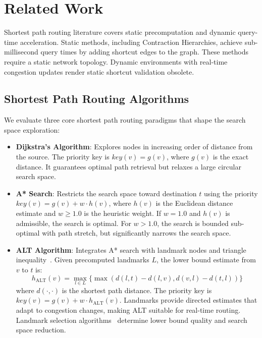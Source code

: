 \section{Related Work}
\label{sec:related}

Shortest path routing literature covers static precomputation and dynamic query-time acceleration. 
Static methods, including Contraction Hierarchies, achieve sub-millisecond query times by adding shortcut edges to the graph. 
These methods require a static network topology. 
Dynamic environments with real-time congestion updates render static shortcut validation obsolete. 

\subsection{Shortest Path Routing Algorithms}
We evaluate three core shortest path routing paradigms that shape the search space exploration:
\begin{itemize}
    \item \textbf{Dijkstra's Algorithm}: Explores nodes in increasing order of distance from the source. The priority key is $key(v) = g(v)$, where $g(v)$ is the exact distance. It guarantees optimal path retrieval but relaxes a large circular search space.
    \item \textbf{A* Search}: Restricts the search space toward destination $t$ using the priority $key(v) = g(v) + w \cdot h(v)$, where $h(v)$ is the Euclidean distance estimate and $w \ge 1.0$ is the heuristic weight. If $w = 1.0$ and $h(v)$ is admissible, the search is optimal. For $w > 1.0$, the search is bounded sub-optimal with path stretch, but significantly narrows the search space.
    \item \textbf{ALT Algorithm}: Integrates A* search with landmark nodes and triangle inequality~\cite{goldberg2004alt}. Given precomputed landmarks $L$, the lower bound estimate from $v$ to $t$ is:
    \begin{equation}
    h_{\text{ALT}}(v) = \max_{l \in L} \{ \max(d(l, t) - d(l, v), d(v, l) - d(t, l)) \}
    \end{equation}
    where $d(\cdot, \cdot)$ is the shortest path distance. The priority key is $key(v) = g(v) + w \cdot h_{\text{ALT}}(v)$. Landmarks provide directed estimates that adapt to congestion changes, making ALT suitable for real-time routing. Landmark selection algorithms~\cite{fuchs2010preprocessing} determine lower bound quality and search space reduction.
\end{itemize} 

